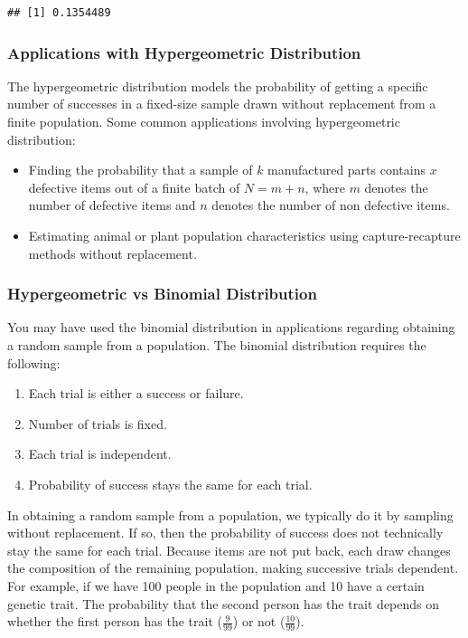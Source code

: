 \documentclass[
]{book}
\providecommand{\tightlist}{%
  \setlength{\itemsep}{0pt}\setlength{\parskip}{0pt}}
\theoremstyle{definition}
\theoremstyle{definition}
\theoremstyle{definition}
\theoremstyle{definition}
\theoremstyle{remark}
\begin{document}
\begin{verbatim}
## [1] 0.1354489
\end{verbatim}

\hypertarget{applications-with-hypergeometric-distribution}{%
\subsubsection{Applications with Hypergeometric Distribution}\label{applications-with-hypergeometric-distribution}}

The hypergeometric distribution models the probability of getting a specific number of successes in a fixed-size sample drawn without replacement from a finite population. Some common applications involving hypergeometric distribution:

\begin{itemize}
\item
  Finding the probability that a sample of \(k\) manufactured parts contains \(x\) defective items out of a finite batch of \(N = m+n\), where \(m\) denotes the number of defective items and \(n\) denotes the number of non defective items.
\item
  Estimating animal or plant population characteristics using capture-recapture methods without replacement.
\end{itemize}

\hypertarget{hypergeometric-vs-binomial-distribution}{%
\subsubsection{Hypergeometric vs Binomial Distribution}\label{hypergeometric-vs-binomial-distribution}}

You may have used the binomial distribution in applications regarding obtaining a random sample from a population. The binomial distribution requires the following:

\begin{enumerate}
\def\labelenumi{\arabic{enumi}.}
\tightlist
\item
  Each trial is either a success or failure.
\item
  Number of trials is fixed.
\item
  Each trial is independent.
\item
  Probability of success stays the same for each trial.
\end{enumerate}

In obtaining a random sample from a population, we typically do it by sampling without replacement. If so, then the probability of success does not technically stay the same for each trial. Because items are not put back, each draw changes the composition of the remaining population, making successive trials dependent. For example, if we have 100 people in the population and 10 have a certain genetic trait. The probability that the second person has the trait depends on whether the first person has the trait (\(\frac{9}{99}\)) or not (\(\frac{10}{99}\)).
\end{document}

